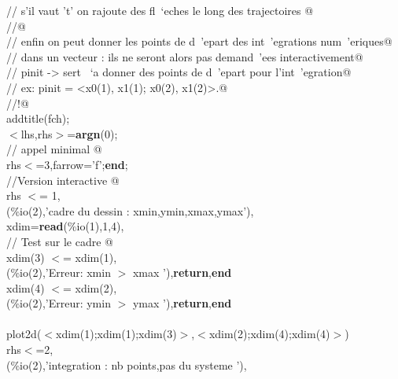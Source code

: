 {\begin{flushleft}
{\cmarg \verb@//  s'il vaut 't' on rajoute des fl\ `eches le long des trajectoires @\\ 
\cmarg \verb@//@\\ 
\cmarg \verb@// enfin on peut donner les points de d\ 'epart des int\ 'egrations num\ 'eriques@\\ 
\cmarg \verb@// dans un vecteur : ils ne seront alors pas demand\ 'ees interactivement@\\ 
\cmarg \verb@// pinit -> sert \ `a donner des points de d\ 'epart pour l'int\ 'egration@\\ 
\cmarg \verb@//          ex: pinit = <x0(1), x1(1); x0(2), x1(2)>.@\\ 
\cmarg \verb@//!@\\ 
\cmarg addtitle(fch);\\ 
\cmarg $<$lhs,rhs$>$={\bf argn}(0);\\ 
\cmarg \verb@// appel minimal @\\ 
 rhs$<$=3,farrow='f';{\bf end};\\ 
\cmarg \verb@//Version interactive @\\ 
 rhs $<$= 1,\\ 
\cmarg \hspace{0.5cm}{\bf write}(\%io(2),'cadre du dessin : xmin,ymin,xmax,ymax'),\\ 
\cmarg \hspace{0.5cm}xdim={\bf read}(\%io(1),1,4),\\ 
\cmarg \verb@// Test sur le cadre @\\ 
\cmarg \hspace{0.5cm}{\bf if} xdim(3) $<$= xdim(1),\\ 
\cmarg \hspace{0.5cm}{\bf write}(\%io(2),'Erreur:  xmin $>$ xmax '),{\bf return},{\bf end}\\ 
\cmarg \hspace{0.5cm}{\bf if} xdim(4) $<$= xdim(2),\\ 
\cmarg \hspace{0.5cm}{\bf write}(\%io(2),'Erreur:  ymin $>$ ymax '),{\bf return},{\bf end}\\ 
 \\ 
\cmarg plot2d($<$xdim(1);xdim(1);xdim(3)$>$,$<$xdim(2);xdim(4);xdim(4)$>$)\\ 
 rhs$<$=2,\\ 
\cmarg \hspace{0.5cm}{\bf write}(\%io(2),'integration : nb points,pas du systeme '),\\ 
}
\end{flushleft}}
